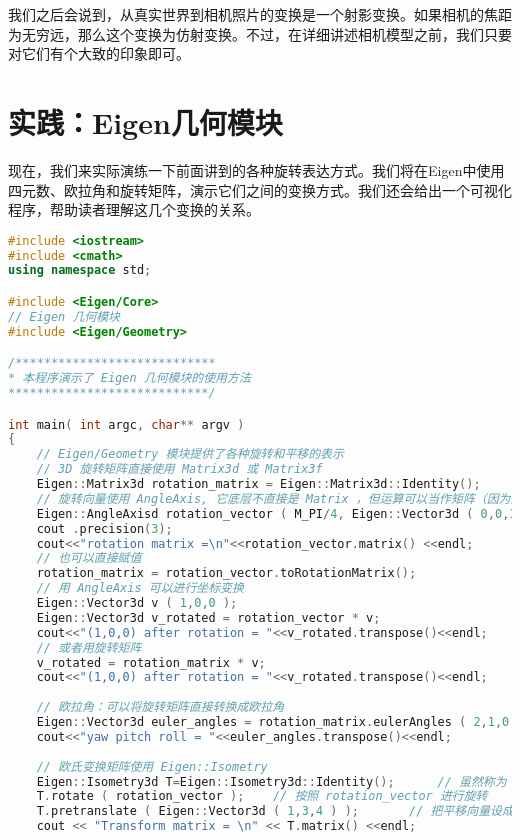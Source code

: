 我们之后会说到，从真实世界到相机照片的变换是一个射影变换。如果相机的焦距为无穷远，那么这个变换为仿射变换。不过，在详细讲述相机模型之前，我们只要对它们有个大致的印象即可。

\section{实践：Eigen几何模块}
现在，我们来实际演练一下前面讲到的各种旋转表达方式。我们将在Eigen中使用四元数、欧拉角和旋转矩阵，演示它们之间的变换方式。我们还会给出一个可视化程序，帮助读者理解这几个变换的关系。

\clearpage
\begin{lstlisting}[language=c++,caption=slambook/ch3/useGeometry/useGeometry.cpp]
#include <iostream>
#include <cmath>
using namespace std;

#include <Eigen/Core>
// Eigen 几何模块
#include <Eigen/Geometry>

/****************************
* 本程序演示了 Eigen 几何模块的使用方法
****************************/

int main( int argc, char** argv )
{
    // Eigen/Geometry 模块提供了各种旋转和平移的表示
	// 3D 旋转矩阵直接使用 Matrix3d 或 Matrix3f
	Eigen::Matrix3d rotation_matrix = Eigen::Matrix3d::Identity();
	// 旋转向量使用 AngleAxis, 它底层不直接是 Matrix ，但运算可以当作矩阵（因为重载了运算符）
	Eigen::AngleAxisd rotation_vector ( M_PI/4, Eigen::Vector3d ( 0,0,1 ) );     // 沿 Z 轴旋转 45 度
	cout .precision(3);
	cout<<"rotation matrix =\n"<<rotation_vector.matrix() <<endl;                //用 matrix() 转换成矩阵
	// 也可以直接赋值
	rotation_matrix = rotation_vector.toRotationMatrix();
	// 用 AngleAxis 可以进行坐标变换
	Eigen::Vector3d v ( 1,0,0 );
	Eigen::Vector3d v_rotated = rotation_vector * v;
	cout<<"(1,0,0) after rotation = "<<v_rotated.transpose()<<endl;
	// 或者用旋转矩阵
	v_rotated = rotation_matrix * v;
	cout<<"(1,0,0) after rotation = "<<v_rotated.transpose()<<endl;
	
	// 欧拉角：可以将旋转矩阵直接转换成欧拉角
	Eigen::Vector3d euler_angles = rotation_matrix.eulerAngles ( 2,1,0 ); // ZYX 顺序，即 yaw pitch roll 顺序
	cout<<"yaw pitch roll = "<<euler_angles.transpose()<<endl;
	
	// 欧氏变换矩阵使用 Eigen::Isometry
	Eigen::Isometry3d T=Eigen::Isometry3d::Identity();      // 虽然称为 3d ，实质上是 4×4 的矩阵
	T.rotate ( rotation_vector );    // 按照 rotation_vector 进行旋转
	T.pretranslate ( Eigen::Vector3d ( 1,3,4 ) );       // 把平移向量设成 (1,3,4)
	cout << "Transform matrix = \n" << T.matrix() <<endl;
	

\end{lstlisting}
